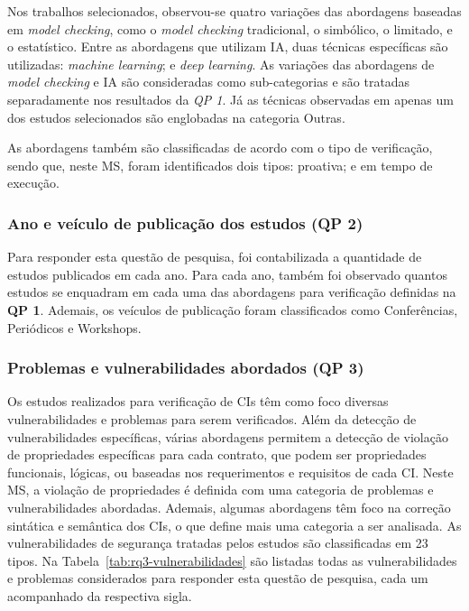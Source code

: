 Nos trabalhos selecionados, observou-se quatro variações das abordagens baseadas em \textit{model checking}, como o \textit{model checking} tradicional, o simbólico, o limitado, e o estatístico. Entre as abordagens que utilizam IA, duas técnicas específicas são utilizadas: \textit{machine learning}; e \textit{deep learning}. As variações das abordagens de \textit{model checking} e IA são consideradas como sub-categorias e são tratadas separadamente nos resultados da \textit{QP 1}. Já as técnicas observadas em apenas um dos estudos selecionados são englobadas na categoria Outras.

As abordagens também são classificadas de acordo com o tipo de verificação, sendo que, neste MS, foram identificados dois tipos: proativa; e em tempo de execução. 

\subsubsection*{Ano e veículo de publicação dos estudos (\textbf{QP 2})}

Para responder esta questão de pesquisa, foi contabilizada a quantidade de estudos publicados em cada ano. Para cada ano, também foi observado quantos estudos se enquadram em cada uma das abordagens para verificação definidas na \textbf{QP 1}. Ademais, os veículos de publicação foram classificados como Conferências, Periódicos e Workshops.

\subsubsection*{Problemas e vulnerabilidades abordados (\textbf{QP 3})}

Os estudos realizados para verificação de CIs têm como foco diversas vulnerabilidades e problemas para serem verificados. Além da detecção de vulnerabilidades específicas, várias abordagens permitem a detecção de violação de propriedades específicas para cada contrato, que podem ser propriedades funcionais, lógicas, ou baseadas nos requerimentos e requisitos de cada CI. Neste MS, a violação de propriedades é definida com uma categoria de problemas e vulnerabilidades abordadas. Ademais, algumas abordagens têm foco na correção sintática e semântica dos CIs, o que define mais uma categoria a ser analisada. As vulnerabilidades de segurança tratadas pelos estudos são classificadas em 23 tipos. Na Tabela~\ref{tab:rq3-vulnerabilidades} são listadas todas as vulnerabilidades e problemas considerados para responder esta questão de pesquisa, cada um acompanhado da respectiva sigla.

